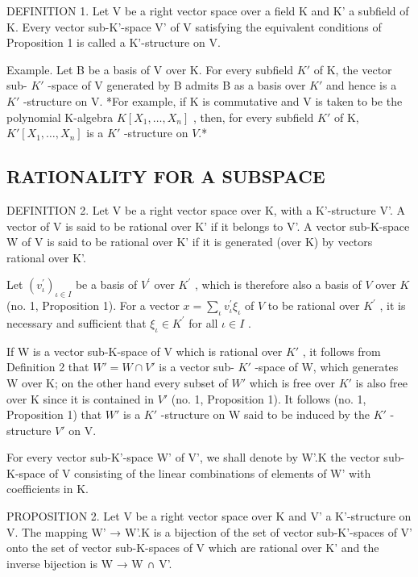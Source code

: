 DEFINITION 1. Let V be a right vector space over a field K and K' a subfield of K. Every vector sub-K'-space V' of V satisfying the equivalent conditions of Proposition 1 is called a K'-structure on V.

Example. Let B be a basis of V over K. For every subfield \(K'\) of K, the vector sub- \(K'\) -space of V generated by B admits B as a basis over \(K'\) and hence is a \(K'\) -structure on V. *For example, if K is commutative and V is taken to be the polynomial K-algebra \(K[X_{1},\ldots,X_{n}]\) , then, for every subfield \(K'\) of K, \(K'[X_{1},\ldots,X_{n}]\) is a \(K'\) -structure on \(V\).*

\subsection{RATIONALITY FOR A SUBSPACE}

DEFINITION 2. Let V be a right vector space over K, with a K'-structure V'. A vector of V is said to be rational over K' if it belongs to V'. A vector sub-K-space W of V is said to be rational over K' if it is generated (over K) by vectors rational over K'.

Let \((v_{\iota}^{\prime})_{\iota\in I}\) be a basis of \(V^{\prime}\) over \(K^{\prime}\) , which is therefore also a basis of \(V\) over \(K\) (no. 1, Proposition 1). For a vector \(x = \sum_{\iota} v_{\iota}^{\prime} \xi_{\iota}\) of \(V\) to be rational over \(K^{\prime}\) , it is necessary and sufficient that \(\xi_{\iota} \in K^{\prime}\) for all \(\iota \in I\) .

If W is a vector sub-K-space of V which is rational over \(K'\) , it follows from Definition 2 that \(W' = W \cap V'\) is a vector sub- \(K'\) -space of W, which generates W over K; on the other hand every subset of \(W'\) which is free over \(K'\) is also free over K since it is contained in \(V'\) (no. 1, Proposition 1). It follows (no. 1, Proposition 1) that \(W'\) is a \(K'\) -structure on W said to be induced by the \(K'\) -structure \(V'\) on V.

For every vector sub-K'-space W' of V', we shall denote by W'.K the vector sub-K-space of V consisting of the linear combinations of elements of W' with coefficients in K.

PROPOSITION 2. Let V be a right vector space over K and V' a K'-structure on V. The mapping W' → W'.K is a bijection of the set of vector sub-K'-spaces of V' onto the set of vector sub-K-spaces of V which are rational over K' and the inverse bijection is W → W ∩ V'.

